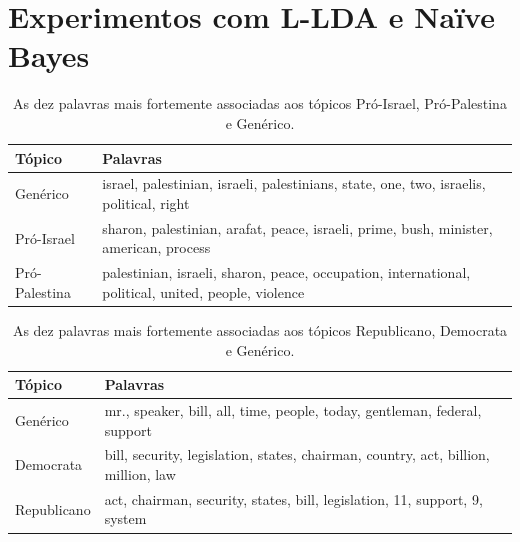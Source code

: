 

\section{Experimentos com L-LDA e Naïve Bayes}

\begin{table}[h]
\centering
\begin{tabular}{| l | p{10cm} | }
\hline
Tópico & Palavras \\ \hline
Genérico & israel, palestinian, israeli, palestinians, state, one, two, israelis, political, right \\ \hline
Pró-Israel & sharon, palestinian, arafat, peace, israeli, prime, bush, minister, american, process \\ \hline
Pró-Palestina & palestinian, israeli, sharon, peace, occupation, international, political, united, people, violence \\ \hline
\end{tabular}
\label{1}
\caption{As dez palavras mais fortemente associadas aos tópicos Pró-Israel, Pró-Palestina e Genérico.}
\end{table}


\begin{table}[h]
\centering
\begin{tabular}{| l | p{10cm} | }
\hline
Tópico & Palavras \\ \hline
Genérico & mr., speaker, bill, all, time, people, today, gentleman, federal, support \\ \hline
Democrata & bill, security, legislation, states, chairman, country, act, billion, million, law \\ \hline
Republicano & act, chairman, security, states, bill, legislation, 11, support, 9, system \\ \hline
\end{tabular}
\label{2}
\caption{As dez palavras mais fortemente associadas aos tópicos Republicano, Democrata e Genérico.}
\end{table}

